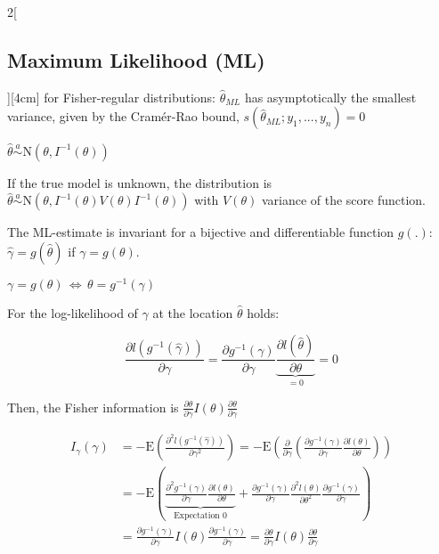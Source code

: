 \documentclass[8pt]{extarticle}
\begin{document}
\begin{multicols}{2}[\subsection{Maximum Likelihood (ML)}][4cm]
\noindent for Fisher-regular distributions: $\hat{\theta}_{ML}$ has asymptotically the smallest variance, given by the Cramér-Rao bound, 
   $s\left(\hat{\theta}_{ML};y_1,...,y_n\right) = 0$
   
$\hat{\theta} \overset{a}{\sim} \mathrm{N}\left(\theta, I^{-1}(\theta)\right)$

\noindent If the true model is unknown, the distribution is $\hat{\theta} \overset{a}{\sim} \mathrm{N}\left(\theta, I^{-1}(\theta)V(\theta)I^{-1}(\theta)\right)$ with $V(\theta)$ variance of the score function.
   
\noindent The ML-estimate is invariant for a bijective and differentiable function $g(.)$: $\hat{\gamma} = g(\hat{\theta})$ if $\gamma = g(\theta)$. 
   
\begin{Proof}
$\gamma = g(\theta)\, \Leftrightarrow \,\theta = g^{-1}(\gamma)$

\noindent For the log-likelihood of $\gamma$ at the location $\hat{\theta}$ holds:

$$\frac{\partial l(g^{-1}(\hat{\gamma}))}{\partial \gamma} = \frac{\partial g^{-1}(\gamma)}{\partial\gamma} \underbrace{\frac{\partial l(\hat{\theta})}{\partial \theta}}_{=0} = 0$$
\end{Proof}   

\noindent Then, the Fisher information is $\frac{\partial\theta}{\partial\gamma} I(\theta) \frac{\partial\theta}{\partial\gamma}$

\begin{Proof}
\vspace{-1.5em}
\begin{align*}
I_{\gamma}(\gamma) &= 
-\mathrm{E}\left(\frac{\partial^2 l(g^{-1}(\hat{\gamma}))}{\partial \gamma^2} \right)= 
-\mathrm{E}\left(\frac{\partial}{\partial\gamma} \left( \frac{\partial g^{-1}(\gamma)}{\partial\gamma} \frac{\partial l(\theta)}{\partial\theta} \right)\right) \\
&= -\mathrm{E}\left(\underbrace{\frac{\partial^2 g^{-1}(\gamma)}{\partial\gamma}\frac{\partial l(\theta)}{\partial\theta}}_{\text{Expectation 0}} + \frac{\partial g^{-1}(\gamma)}{\partial\gamma}\frac{\partial^2l(\theta)}{\partial\theta^2}\frac{\partial g^{-1}(\gamma)}{\partial\gamma}\right) \\
&= \frac{\partial g^{-1}(\gamma)}{\partial\gamma} I(\theta) \frac{\partial g^{-1}(\gamma)}{\partial\gamma} = \frac{\partial \theta}{\partial\gamma} I(\theta) \frac{\partial \theta}{\partial\gamma}
\end{align*}
\end{Proof}


\end{multicols}
\end{document}

